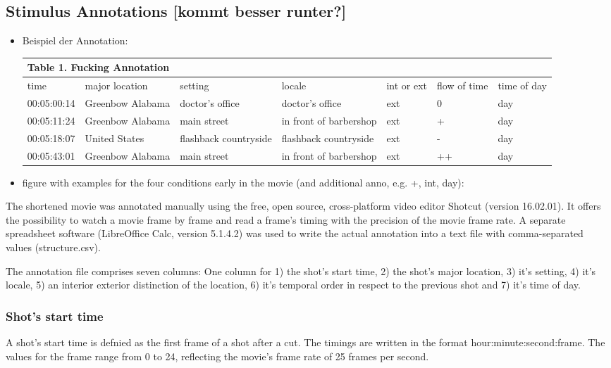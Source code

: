\documentclass[10pt,a4paper,twocolumn]{article}
\begin{document}
\subsection{Stimulus Annotations {[}kommt besser runter?{]}}
\begin{itemize}
\item Beispiel der Annotation: 
\begin{table}[h]
\begin{tabular}{lllllll}
\multicolumn{7}{l}{Table 1. Fucking Annotation}\tabularnewline
\hline 
time & major location & setting & locale & int or ext & flow of time & time of day\tabularnewline
00:05:00:14  & Greenbow Alabama  & doctor's office  & doctor's office  & ext  & 0 & day\tabularnewline
00:05:11:24  & Greenbow Alabama  & main street  & in front of barbershop  & ext  & + & day\tabularnewline
00:05:18:07  & United States  & flashback countryside  & flashback countryside  & ext  & - & day\tabularnewline
00:05:43:01 & Greenbow Alabama  & main street  & in front of barbershop  & ext  & ++ & day\tabularnewline
\hline 
\end{tabular}
\end{table}

\item figure with examples for the four conditions early in the movie (and
additional anno, e.g. +, int, day):
\end{itemize}
The shortened movie was annotated manually using the free, open source,
cross-platform video editor Shotcut (version 16.02.01). It offers
the possibility to watch a movie frame by frame and read a frame's timing
with the precision of the movie frame rate. A separate spreadsheet
software (LibreOffice Calc, version 5.1.4.2) was used to write the
actual annotation into a text file with comma-separated values (structure.csv). 

The annotation file comprises seven columns: One column for 1) the
shot's start time, 2) the shot's major location, 3) it's setting,
4) it's locale, 5) an interior exterior distinction of the location,
6) it's temporal order in respect to the previous shot and 7) it's
time of day. 


\subsubsection{Shot's start time}

A shot's start time is defnied as the first frame of a shot after
a cut. The timings are written in the format hour:minute:second:frame.
The values for the frame range from 0 to 24, reflecting the movie's
frame rate of 25 frames per second. 
\end{document}
